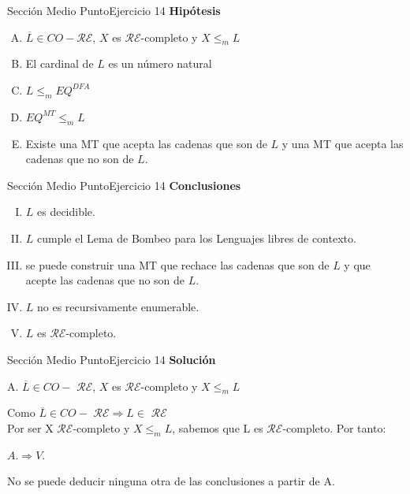 \documentclass[10pt, envcountsect, presentation, aspectratio=169]{beamer}
\newcommand{\lr}{\ensuremath{\mathcal {RE}}}
\begin{document}

\begin{frame}{Sección Medio Punto}{Ejercicio 14}
    \textbf{Hipótesis}
    \begin{enumerate}[A.]
        \item $\overline{L} \in CO-\lr$, $X$ es \lr-completo y $X \le_m  L$
        \item El cardinal de $L$ es un número natural
        \item $L \le_m  EQ^{DFA}$  
        \item $EQ^{MT} \le_m L$ 
        \item Existe una MT que acepta las cadenas que son de $L$ y una MT que acepta las cadenas que no son de $L$. 
    \end{enumerate}
\end{frame}


\begin{frame}{Sección Medio Punto}{Ejercicio 14}
    \textbf{Conclusiones}
    \begin{enumerate}[I.]
        \item $L$ es  decidible.
        \item $L$ cumple el Lema de Bombeo para los Lenguajes  libres de contexto.
        \item se puede construir una MT que rechace las cadenas que son de $L$ y que acepte las cadenas que no son de $L$.
        \item $L$ no es recursivamente enumerable.
        \item $L$ es \lr-completo. 
    \end{enumerate}
\end{frame}




\begin{frame}{Sección Medio Punto}{Ejercicio 14}
    \textbf{Solución}\\
     \begin{center}
        A. $\overline{L} \in CO-$ \lr, $X$ es \lr-completo y $X \le_m  L$
    \end{center}
    Como $\overline{L} \in CO-$ \lr $\Rightarrow L\in$ \lr \\ 
    Por ser X \lr-completo y $X \leq_m L$, sabemos que L es \lr-completo. Por tanto:\\
    \begin{center}
        $A. \Rightarrow V.$
    \end{center}
    No se puede deducir ninguna otra de las conclusiones a partir de A.
\end{frame}
\end{document}
